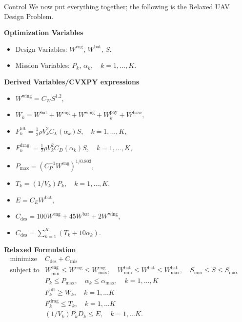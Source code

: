 \begin{chapter}{Control}
    \vspace{0.1cm}
    \noindent We now put everything together; the following is the Relaxed UAV Design Problem.

    \noindent\textbf{Optimization Variables}
    \begin{itemize}
        \item Design Variables: $W^{\mathrm{eng}}$, $W^{\mathrm{bat}}$, $S$.
        \item Mission Variables: $P_k$, $\alpha_k, \quad k=1, \ldots, K$.
    \end{itemize}

    \noindent\textbf{Derived Variables/CVXPY expressions}
    \begin{itemize}
        \item $W^{\mathrm{wing}} = C_W S^{1.2}$,
        \item $W_k = W^{\mathrm{bat}} + W^{\mathrm{eng}} + W^{\mathrm{wing}} + W^{\mathrm{pay}}_k + W^{\mathrm{base}}$,
        \item $F_{k}^{\mathrm{lift}} = \frac{1}{2} \rho V_k^2 C_L\left(\alpha_k\right) S, \quad k = 1, \ldots, K$,
        \item $F_k^{\text {drag }}=\frac{1}{2} \rho V_k^2 C_D\left(\alpha_k\right) S, \quad k = 1, \ldots, K$,
        \item $P_{\mathrm{max}} = \left(C_P^{-1} W^{\mathrm{eng}}\right)^{1/0.803}$,
        \item $T_k = \left(1/V_k \right)P_k, \quad k=1, \ldots, K$,
        \item $E = C_{E}W^{\mathrm{bat}}$,
        \item $C_{\mathrm{des}} = 100W^{\mathrm{eng}} + 45W^{\mathrm{bat}} + 2W^{\mathrm{wing}}$,
        \item $C_{\mathrm{des}} = \sum_{k=1}^{K}\left(T_k + 10\alpha_k \right)$.
    \end{itemize}

    \noindent\textbf{Relaxed Formulation}
    \[\begin{array}{lll}
    \text{minimize} \; & C_{\mathrm{des}} + C_{\mathrm{mis}} &  \\
    \text{subject to} 
                      & W_{\min }^{\mathrm{eng}} \leq W^{\mathrm{eng}} \leq W_{\max }^{\mathrm{eng}},
                      \quad W_{\min }^{\mathrm{bat}} \leq W^{\mathrm{bat}} \leq W_{\max }^{\mathrm{bat}}, 
                      \quad S_{\min } \leq S \leq S_{\max } & \\
                      & P_k \le P_{\mathrm{max}}, \quad \alpha_k \le \alpha_{\mathrm{max}}, \quad k = 1, \ldots, K & \\
                      & F_{k}^{\mathrm{lift}} \ge W_k, \quad k = 1, \ldots K & \\
                      & F_{k}^{\mathrm{drag}} \le T_k, \quad k = 1, \ldots K & \\
                        & (1/V_k) P_k D_k \le E, \quad k = 1, \ldots K. & 
    \end{array}\]


\end{chapter}

